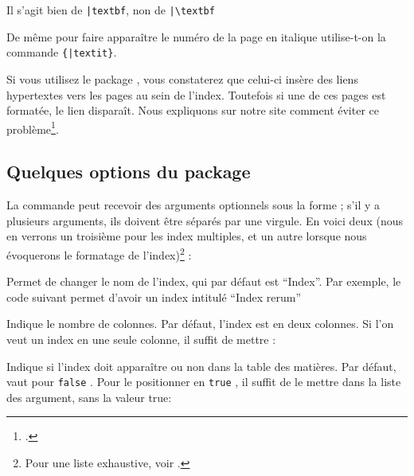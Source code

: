 \begin{attention}
Il s'agit bien de \verb+|textbf+, non de \verb+|\textbf+
\end{attention}

De même pour faire apparaître le numéro de la page en italique utilise-t-on la commande \verb|{|\verb+|textit}+.





\begin{plusloins}
Si vous utilisez le package , vous constaterez que celui-ci insère des liens hypertextes vers les pages au sein de l'index. Toutefois si une de ces pages est formatée, le lien disparaît. Nous expliquons sur notre site comment éviter ce problème\footcite{indexhypergras}.
\end{plusloins}


\subsection{Quelques options du package }



La commande  peut recevoir des arguments optionnels sous la forme  ; s'il y a plusieurs arguments, ils doivent être séparés par une virgule. En voici deux (nous en verrons un troisième pour les index multiples, et un autre lorsque nous évoquerons le formatage de l'index)\footnote{Pour une liste exhaustive, voir \cite{imakeidx}.} :
\begin{fieldlist}
 Permet de changer le nom de l'index, qui par défaut est \enquote{Index}. Par exemple, le code suivant permet d'avoir un index intitulé \enquote{Index rerum} 

\begin{latexcode}
\makeindex[title = Index rerum]
\end{latexcode}

 Indique le nombre de colonnes. Par défaut, l'index est en deux colonnes. Si l'on veut un index en une seule colonne, il suffit  de mettre  :

\begin{latexcode}
\makeindex[title = Index rerum, columns = 1]
\end{latexcode}

 Indique si l'index doit apparaître ou non dans la table des matières. Par défaut, vaut pour \verb|false| . Pour le positionner en \verb|true| , il suffit de le mettre dans la liste des argument, sans la valeur true: 

\begin{latexcode}
\makeindex[title = Index rerum, columns = 1, intoc]
\end{latexcode}
\end{fieldlist}

